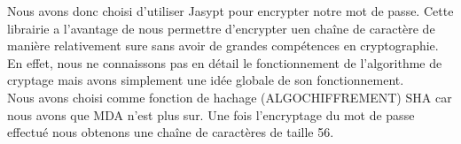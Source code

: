 Nous avons donc choisi d'utiliser Jasypt pour encrypter notre mot de passe. Cette librairie a l'avantage de nous permettre d'encrypter uen chaîne de caractère de manière relativement sure sans avoir de grandes compétences en cryptographie. En effet, nous ne connaissons pas en détail le fonctionnement de l'algorithme de cryptage mais avons simplement une idée globale de son fonctionnement. \\

Nous avons choisi comme fonction de hachage (ALGOCHIFFREMENT) SHA car nous avons que MDA n'est plus sur. Une fois l'encryptage du mot de passe effectué nous obtenons une chaîne de caractères de taille 56.